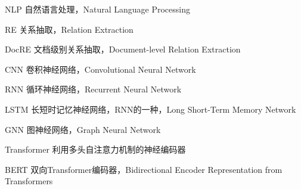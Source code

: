 
\begin{denotation}[3cm]
\item[NLP]	自然语言处理，Natural Language Processing
\item[RE]	关系抽取，Relation Extraction
\item[DocRE]	文档级别关系抽取，Document-level Relation Extraction
\item[CNN]	卷积神经网络，Convolutional Neural Network
\item[RNN]	循环神经网络，Recurrent Neural Network
\item[LSTM]	长短时记忆神经网络，RNN的一种，Long Short-Term Memory Network
\item[GNN]	图神经网络，Graph Neural Network
\item[Transformer]	利用多头自注意力机制的神经编码器
\item[BERT]	双向Transformer编码器，Bidirectional Encoder Representation from Transformers


\end{denotation}





